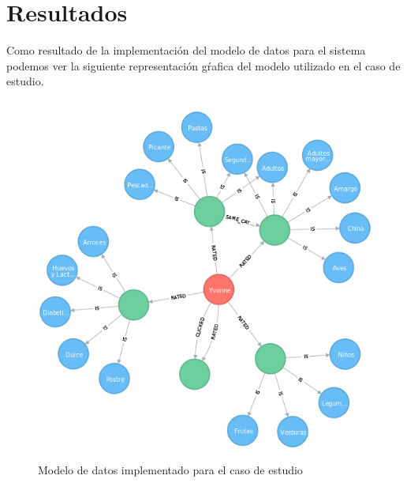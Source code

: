   \section{Resultados}
    Como resultado de la implementación del modelo de datos para el sistema podemos ver la siguiente representación gŕafica del modelo utilizado en el caso de estudio. 
    \newpage
          \begin{landscape}
            \begin{figure}[h!]
            \centering
            \includegraphics[width=22.5cm,height=12cm]{./images/graph}
            \caption{Modelo de datos implementado para el caso de estudio}
          \end{figure}
          \end{landscape}
        \newpage

